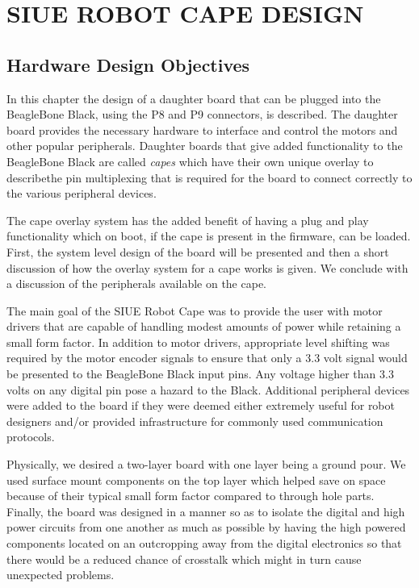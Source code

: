 \documentclass[12pt,oneside,final]{siuethesis}
\theoremstyle{definition}
\begin{document}
\chapter{SIUE ROBOT CAPE DESIGN}

\section{Hardware Design Objectives}

In this chapter the design of a daughter board that can be plugged into the BeagleBone Black, using the P8 and P9 connectors, is described.  The daughter board provides the necessary hardware to interface and control the motors and other popular peripherals. Daughter boards that give added functionality to the BeagleBone Black are called \emph{capes} which have their own unique overlay to describethe pin multiplexing that is required for the board to connect correctly to the various peripheral devices. 

The cape overlay system has the added benefit of having a plug and play functionality which on boot, if the cape is present in the firmware, can be loaded.  First, the system level design of the board will be presented and then a short discussion of how the overlay system for a cape works is given. We conclude with a discussion of the peripherals available on the cape.

The main goal of the SIUE Robot Cape was to provide the user with motor drivers that are capable of handling modest amounts of power while retaining a small form factor. In addition to motor drivers, appropriate level shifting was required by the motor encoder signals to ensure that only a 3.3 volt signal would be presented to the BeagleBone Black input pins. Any voltage higher than 3.3 volts on any digital pin pose a hazard to the Black. Additional peripheral devices were added to the board if they were deemed either extremely useful for robot designers and/or provided infrastructure for commonly used communication protocols. 

Physically, we desired a two-layer board with one layer being a ground pour. We used surface mount components on the top layer which helped save on space because of their typical small form factor compared to through hole parts. Finally, the board was designed in a manner so as to isolate the digital and high power circuits from one another as much as possible by having the high powered components located on an outcropping away from the digital electronics so that there would be a reduced chance of crosstalk which might in turn cause unexpected problems.
\end{document}
